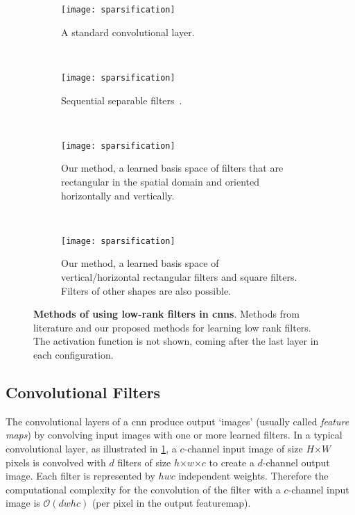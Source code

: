 \documentclass[thesis]{subfiles}
\begin{document}
    \begin{figure}[tbp] 
        \begin{subfigure}[b]{0.98\textwidth}
            \centering
            \texttt{[image: sparsification]}
            \caption{A standard convolutional layer.}\label{fig:fullrank}
        \end{subfigure}\\
        \begin{subfigure}[b]{0.98\textwidth}
            \centering
            \texttt{[image: sparsification]}
            \caption{Sequential separable filters~\citep{journals/corr/JaderbergVZ14}.}\label{fig:separableseq}
        \end{subfigure}\\
        \begin{subfigure}[b]{0.98\textwidth}
            \centering
            \texttt{[image: sparsification]}
            \caption{Our method, a learned basis space of filters that are rectangular in the spatial domain and oriented horizontally and vertically.}\label{fig:ourmethod}
        \end{subfigure}\\
        \begin{subfigure}[b]{0.98\textwidth}
            \centering
            \texttt{[image: sparsification]}
            \caption{Our method, a learned basis space of vertical/horizontal rectangular filters and square filters. Filters of other shapes are also possible.}\label{fig:ourmethodfullrank}
        \end{subfigure}
        \caption[Overview of methods of using low-rank filters]{\textbf{Methods of using low-rank filters in \glspl{cnn}}. Methods from literature and our proposed methods for learning low rank filters. The activation function is not shown, coming after the last layer in each configuration.}\label{fig:separablemethods}
    \end{figure}
    
    \subsection{Convolutional Filters}
    
    The convolutional layers of a \gls{cnn} produce output `images' (usually called \emph{feature maps}) by convolving input images with one or more learned filters. %
    In a typical convolutional layer, as illustrated in \cref{fig:fullrank}, a $c$-channel input image of size $H$$\times$$W$ pixels is convolved with $d$ filters of size $h$$\times$$w$$\times$$c$ to create a $d$-channel output image. Each filter is represented by $h w c$ independent weights. Therefore the computational complexity for the convolution of the filter with a $c$-channel input image is $\mathcal{O}(d w h c)$ (per pixel in the output \gls{featuremap}).
    
\end{document}
